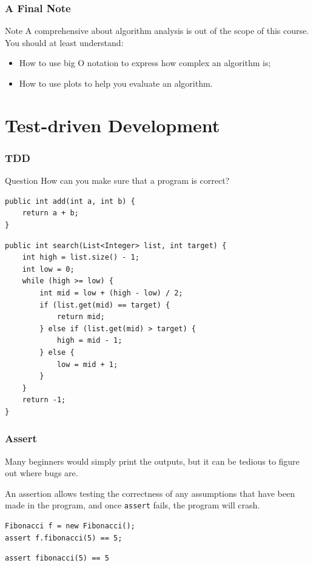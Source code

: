 \documentclass[aspectratio=169, 14pt]{beamer}
\begin{document}
\begin{frame}
    \frametitle{A Final Note}
\begin{alertblock}{Note}
    A comprehensive about algorithm analysis is out of the scope of this course. You should at least understand:
    
    \begin{itemize}
        \item How to use big O notation to express how complex an algorithm is;
        \item How to use plots to help you evaluate an algorithm.
    \end{itemize}
\end{alertblock}
\end{frame}

\section{\textcolor{darkmidnightblue}{Test-driven Development}}
\begin{frame}[fragile]
    \frametitle{TDD}
    \begin{exampleblock}{Question}
    How can you make sure that a program is correct?
    \end{exampleblock}
    \begin{verbatim}
public int add(int a, int b) {
    return a + b;
} 
    \end{verbatim} 
\end{frame}

\begin{frame}[fragile]
    \begin{verbatim}
public int search(List<Integer> list, int target) {
    int high = list.size() - 1;
    int low = 0;
    while (high >= low) {
        int mid = low + (high - low) / 2;
        if (list.get(mid) == target) {
            return mid;
        } else if (list.get(mid) > target) {
            high = mid - 1;
        } else {
            low = mid + 1;
        }
    }
    return -1;
}
    \end{verbatim} 
\end{frame}

\begin{frame}[fragile]
    \frametitle{Assert}
    Many beginners would simply print the outputs, but it can be tedious to figure out where bugs are.

\pause
An \alert{assertion} allows testing the correctness of any assumptions that have been made in the program, and once \texttt{assert} fails, the program will crash. 

\begin{verbatim}
Fibonacci f = new Fibonacci();
assert f.fibonacci(5) == 5;
\end{verbatim}

\begin{verbatim}
assert fibonacci(5) == 5
\end{verbatim}

\end{frame}
\end{document}
